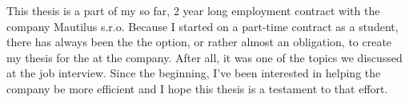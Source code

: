 \documentclass[12pt,oneside]{fithesis2}
\begin{document}
This thesis is a part of my so far, 2 year long employment contract with the company Mautilus s.r.o. Because I started on a part-time contract as a student, there has always been the the option, or rather almost an obligation, to create my thesis for the at the company. After all, it was one of the topics we discussed at the job interview. Since the beginning, I've been interested in helping the company be more efficient and I hope this thesis is a testament to that effort.
\printbibliography
\listoffigures
\end{document}
